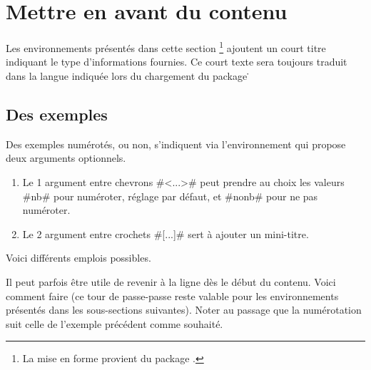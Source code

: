 \documentclass[12pt, a4paper]{article}
\begin{document}
\section{Mettre en avant du contenu}

\begin{tdocnote}
    Les environnements présentés dans cette section
    \footnote{
        La mise en forme provient du package .
    }
    ajoutent un court titre indiquant le type d'informations fournies.
    Ce court texte sera toujours traduit dans la langue indiquée lors du chargement du package \thispack\.
\end{tdocnote}



\subsection{Des exemples}

Des exemples numérotés, ou non, s'indiquent via l'environnement  qui propose deux arguments optionnels.

\begin{enumerate}
    \item Le 1\ier{} argument entre chevrons \tdocinlatex#<...># peut prendre au choix les valeurs \tdocinlatex#nb# pour numéroter, réglage par défaut, et \tdocinlatex#nonb# pour ne pas numéroter.

    \item Le 2\ieme{} argument entre crochets \tdocinlatex#[...]# sert à ajouter un mini-titre.
\end{enumerate}


Voici différents emplois possibles.









\begin{tdoctip}
    Il peut parfois être utile de revenir à la ligne dès le début du contenu. Voici comment faire (ce tour de passe-passe reste valable pour les environnements présentés dans les sous-sections suivantes). Noter au passage que la numérotation suit celle de l'exemple précédent comme souhaité.

\end{tdoctip}
\end{document}
